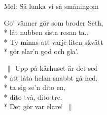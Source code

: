 \begin{SongText}
    \begin{SongInfo}
        Mel: Så lunka vi så småningom
    \end{SongInfo}
    \begin{SongVerse}
        Go’ vänner gör som broder Seth,\\*%
        låt nubben sista resan ta..\\*%
        Ty minns att varje liten skvätt\\*%
        gör elar’n god och gla’.
    \end{SongVerse}
    \begin{SongVerse}
        $\:\|$ Upp på kårhuset är det sed\\*%
        att låta helan snabbt gå ned,\\*%
        ta sig se’n dito en,\\*%
        dito två, dito tre.\\*%
        Det gör var elare! $\:\|$
    \end{SongVerse}
\end{SongText}
